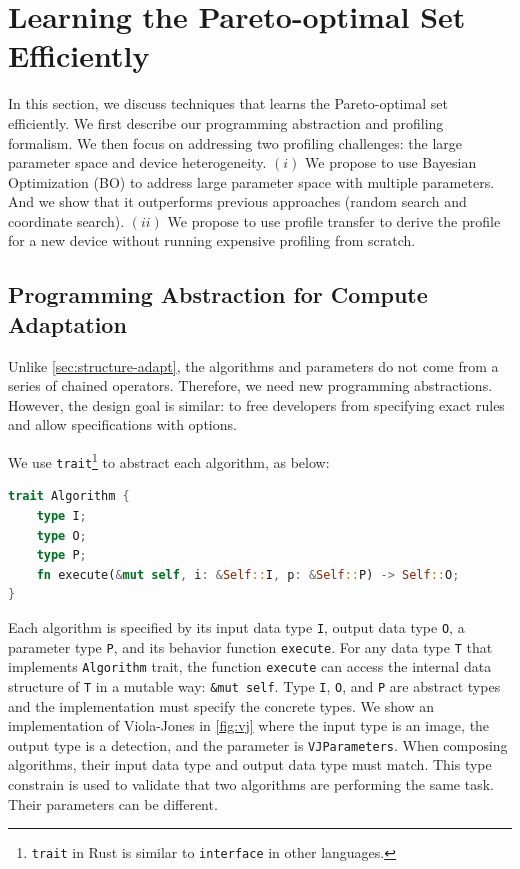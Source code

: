 \section{Learning the Pareto-optimal Set Efficiently }
\label{sec:learn-pareto-optim}

In this section, we discuss techniques that learns the Pareto-optimal set
efficiently. We first describe our programming abstraction and profiling
formalism. We then focus on addressing two profiling challenges: the large
parameter space and device heterogeneity. $(i)$ We propose to use Bayesian
Optimization (BO) to address large parameter space with multiple parameters. And
we show that it outperforms previous approaches (random search and coordinate
search). $(ii)$ We propose to use profile transfer to derive the profile for a
new device without running expensive profiling from scratch.

\subsection{Programming Abstraction for Compute Adaptation}
\label{sec:progr-abstr}

Unlike \autoref{sec:structure-adapt}, the algorithms and parameters do not come
from a series of chained operators. Therefore, we need new programming
abstractions. However, the design goal is similar: to free developers from
specifying exact rules and allow specifications with options.

We use \texttt{trait}\footnote{\texttt{trait} in Rust is similar to
  \texttt{interface} in other languages.} to abstract each algorithm, as below:

\begin{lstlisting}[xleftmargin=.1\textwidth, xrightmargin=.1\textwidth, language=Rust]
trait Algorithm {
    type I;
    type O;
    type P;
    fn execute(&mut self, i: &Self::I, p: &Self::P) -> Self::O;
}
\end{lstlisting}

Each algorithm is specified by its input data type \texttt{I}, output data type
\texttt{O}, a parameter type \texttt{P}, and its behavior function
\texttt{execute}. For any data type \texttt{T} that implements
\texttt{Algorithm} trait, the function \texttt{execute} can access the internal
data structure of \texttt{T} in a mutable way: \texttt{\&mut self}. Type
\texttt{I}, \texttt{O}, and \texttt{P} are abstract types and the implementation
must specify the concrete types. We show an implementation of Viola-Jones in
\autoref{fig:vj} where the input type is an image, the output type is a
detection, and the parameter is \texttt{VJParameters}. When composing
algorithms, their input data type and output data type must match. This type
constrain is used to validate that two algorithms are performing the same
task. Their parameters can be different.

